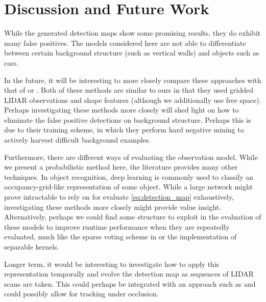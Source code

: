\section{Discussion and Future Work} \label{sec:discussion}

While the generated detection maps show some promising results, they do exhibit
many false positives. The models considered here are not able to differentiate
between certain background structure (such as vertical walls) and objects such
as cars.

In the future, it will be interesting to more closely compare these approaches
with that of \citep{wang2015RSS} or \citep{Engelcke2017ICRA}. Both of these
methods are similar to ours in that they used gridded \ac{LIDAR} observations
and shape features (although we additionally use free space). Perhaps
investigating these methods more closely will shed light on how to eliminate the
false positive detections on background structure. Perhaps this is due to their
training scheme, in which they perform hard negative mining to actively harvest
difficult background examples.

Furthermore, there are different ways of evaluating the observation model. While
we present a probabilistic method here, the literature provides many other
techniques. In object recognition, deep learning is commonly used to classify an
occupancy-grid-like representation of some object. While a large network might
prove intractable to rely on for evaluate \eqref{eq:detection_map} exhaustively,
investigating these methods more closely might provide value insight.
Alternatively, perhaps we could find some structure to exploit in the evaluation
of these models to improve runtime performance when they are repeatedly
evaluated, much like the sparse voting scheme in \citet{wang2015RSS} or the
implementation of separable kernels.

Longer term, it would be interesting to investigate how to apply this
representation temporally and evolve the detection map as sequences of
\ac{LIDAR} scans are taken. This could perhaps be integrated with an approach
such as \cite{ushani2017ICRA} and could possibly allow for tracking under
occlusion.

